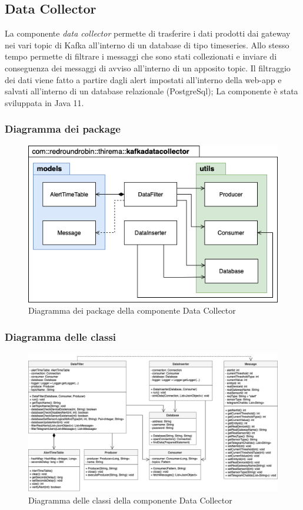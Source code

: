 \subsection{Data Collector}
La componente \textit{data collector} permette di trasferire i dati prodotti dai gateway nei vari topic di Kafka all'interno di un database di tipo timeseries. Allo stesso tempo permette di filtrare i messaggi che sono stati collezionati e inviare di conseguenza dei messaggi di avviso all'interno di un apposito topic.
Il filtraggio dei dati viene fatto a partire dagli alert impostati all'interno della web-app e salvati all'interno di un database relazionale (PostgreSql);
La componente è stata sviluppata in Java 11.
	\subsubsection{Diagramma dei package}%
	\begin{figure}[H]
			\centering
			\includegraphics[scale=0.600]{res/images/DATACOLLECTOR/Packagekafkadatacollector.png}
			\caption{Diagramma dei package della componente Data Collector}
			\label{Diagramma 5}
		\end{figure}
	\begin{landscape}
	\subsubsection{Diagramma delle classi}%
		\begin{figure}[H]
			\centering
			\includegraphics[scale=0.550]{res/images/DATACOLLECTOR/ClassikafkaDataCollector.png}
			\caption{Diagramma delle classi della componente Data Collector}
			\label{Diagramma 6}
		\end{figure}
	\end{landscape}
